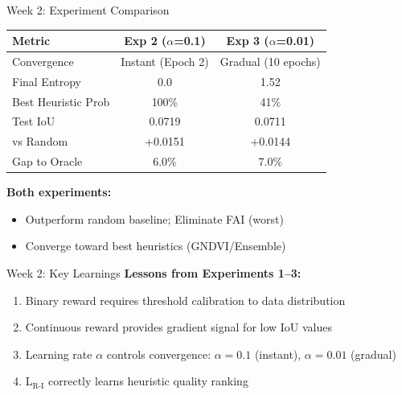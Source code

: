 \documentclass[10pt,xcolor={table,dvipsnames},t]{beamer}
\begin{document}
\begin{frame}{Week 2: Experiment Comparison}
\footnotesize
\begin{table}
\centering
\begin{tabular}{lcc}
\toprule
\textbf{Metric} & \textbf{Exp 2 ($\alpha$=0.1)} & \textbf{Exp 3 ($\alpha$=0.01)} \\
\midrule
Convergence & Instant (Epoch 2) & Gradual (10 epochs) \\
Final Entropy & 0.0 & 1.52 \\
Best Heuristic Prob & 100\% & 41\% \\
Test IoU & 0.0719 & 0.0711 \\
vs Random & +0.0151 & +0.0144 \\
Gap to Oracle & 6.0\% & 7.0\% \\
\bottomrule
\end{tabular}
\end{table}

\small
\textbf{Both experiments:}
\begin{itemize}
  \item \textcolor{green}{\checkmark} Outperform random baseline; \textcolor{green}{\checkmark} Eliminate FAI (worst)
  \item \textcolor{green}{\checkmark} Converge toward best heuristics (GNDVI/Ensemble)
\end{itemize}

\end{frame}

\begin{frame}{Week 2: Key Learnings}
\small
\textbf{Lessons from Experiments 1--3:}
\begin{enumerate}
  \item Binary reward requires threshold calibration to data distribution
  \item Continuous reward provides gradient signal for low IoU values
  \item Learning rate $\alpha$ controls convergence: $\alpha=0.1$ (instant), $\alpha=0.01$ (gradual)
  \item L$_{\text{R-I}}$ correctly learns heuristic quality ranking
\end{enumerate}

\end{frame}
\end{document}
